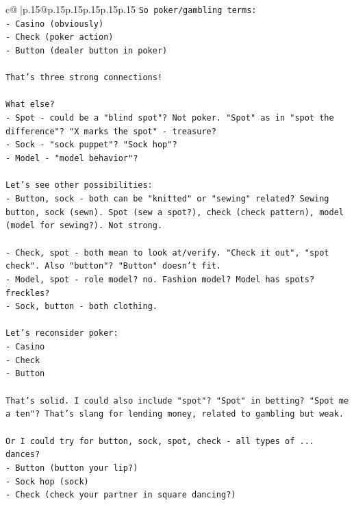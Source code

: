 \documentclass{article}
\begin{document}
{\begin{supertabular}{c@{$\;$}|p{.15\linewidth}@{}p{.15\linewidth}p{.15\linewidth}p{.15\linewidth}p{.15\linewidth}p{.15\linewidth}}
{{{\texttt{So poker/gambling terms:} \\
\texttt{{-} Casino (obviously)} \\
\texttt{{-} Check (poker action)} \\
\texttt{{-} Button (dealer button in poker)} \\
\\ 
\texttt{That's three strong connections!} \\
\\ 
\texttt{What else?} \\
\texttt{{-} Spot {-} could be a "blind spot"? Not poker. "Spot" as in "spot the difference"? "X marks the spot" {-} treasure?} \\
\texttt{{-} Sock {-} "sock puppet"? "Sock hop"?} \\
\texttt{{-} Model {-} "model behavior"?} \\
\\ 
\texttt{Let's see other possibilities:} \\
\texttt{{-} Button, sock {-} both can be "knitted" or "sewing" related? Sewing button, sock (sewn). Spot (sew a spot?), check (check pattern), model (model for sewing?). Not strong.} \\
\\ 
\texttt{{-} Check, spot {-} both mean to look at/verify. "Check it out", "spot check". Also "button"? "Button" doesn't fit.} \\
\texttt{{-} Model, spot {-} role model? no. Fashion model? Model has spots? freckles?} \\
\texttt{{-} Sock, button {-} both clothing.} \\
\\ 
\texttt{Let's reconsider poker:} \\
\texttt{{-} Casino} \\
\texttt{{-} Check} \\
\texttt{{-} Button} \\
\\ 
\texttt{That's solid. I could also include "spot"? "Spot" in betting? "Spot me a ten"? That's slang for lending money, related to gambling but weak.} \\
\\ 
\texttt{Or I could try for button, sock, spot, check {-} all types of ... dances?} \\
\texttt{{-} Button (button your lip?)} \\
\texttt{{-} Sock hop (sock)} \\
\texttt{{-} Check (check your partner in square dancing?)} \\
}}}
\end{supertabular}}
\end{document}

